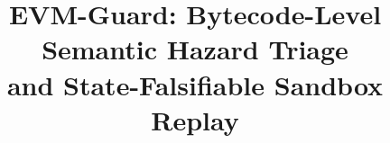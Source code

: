 \documentclass[conference]{IEEEtran}
\begin{document}
\title{\huge EVM-Guard: Bytecode-Level Semantic Hazard Triage\\and State-Falsifiable Sandbox Replay}

\author{}


\maketitle
\end{document}
